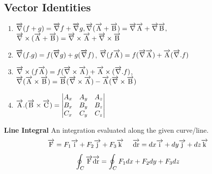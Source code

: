 \subsection*{Vector Identities}
\begin{enumerate}
    \item \(\overrightarrow{\rm \nabla}(f+g)=\overrightarrow{\rm \nabla} f +\overrightarrow{\rm \nabla} g,\)\hspace{1cm}\(\overrightarrow{\rm \nabla}(\overrightarrow{\rm A}+\overrightarrow{\rm B}) = \overrightarrow{\rm \nabla}\overrightarrow{\rm A}+ \overrightarrow{\rm \nabla}\overrightarrow{\rm B},\)\hspace{1cm} \(\overrightarrow{\rm \nabla}\times(\overrightarrow{\rm A}+\overrightarrow{\rm B})=\overrightarrow{\rm \nabla}\times\overrightarrow{\rm A}+\overrightarrow{\rm \nabla}\times\overrightarrow{\rm B}\)
    \item \(\overrightarrow{\rm \nabla}(f.g) = f(\overrightarrow{\rm \nabla} g) + g(\overrightarrow{\rm \nabla} f)\),\hspace{1cm}  \(\overrightarrow{\rm \nabla}(f\overrightarrow{\rm A})=f(\overrightarrow{\rm \nabla} \overrightarrow{\rm A})+\overrightarrow{\rm A}(\overrightarrow{\rm \nabla}.f)\) \hspace{1cm}
    \item  \(\overrightarrow{\rm \nabla}\times(f\overrightarrow{\rm A})=f(\overrightarrow{\rm \nabla}\times\overrightarrow{\rm A})+\overrightarrow{\rm A}\times(\overrightarrow{\rm \nabla}.f)\), \hspace{1cm} \(\overrightarrow{\rm \nabla}(\overrightarrow{\rm A}\times\overrightarrow{\rm B})=\overrightarrow{\rm B}(\overrightarrow{\rm \nabla}\times\overrightarrow{\rm A})-\overrightarrow{\rm A}(\overrightarrow{\rm \nabla}\times\overrightarrow{\rm B})\)
    \item \(\overrightarrow{\rm A}.(\overrightarrow{\rm B}\times\overrightarrow{\rm C})=
    \begin{vmatrix} A_x & A_y & A_z \\ B_x & B_y & B_z \\ C_x & C_y & C_z \end{vmatrix}
    \)
\end{enumerate}
\textbf{\large{Line Integral}} An integration evaluated along the given curve/line.
\[\overrightarrow{\rm F} = F_1\overrightarrow{\rm i}+F_2\overrightarrow{\rm j}+F_3\overrightarrow{\rm k}\ \ \ \ \overrightarrow{\rm dr}=dx\overrightarrow{\rm i}+dy\overrightarrow{\rm j}+dz\overrightarrow{\rm k}\]
\[\oint_C\overrightarrow{\rm F}\overrightarrow{\rm dr}=\oint_CF_1dx+F_2dy+F_3dz\]
